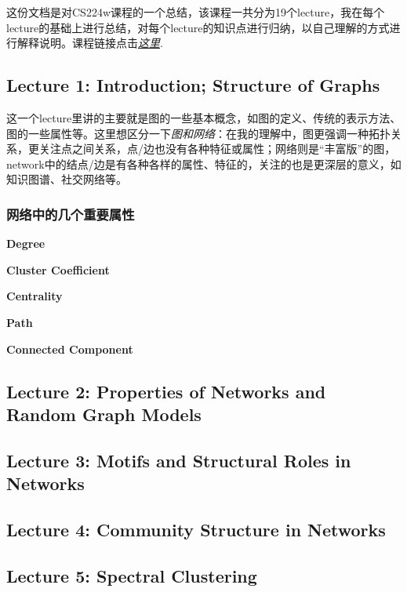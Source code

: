这份文档是对CS224w课程的一个总结，该课程一共分为19个lecture，我在每个lecture的基础上进行总结，对每个lecture的知识点进行归纳，以自己理解的方式进行解释说明。课程链接点击\href{http://web.stanford.edu/class/cs224w/}{\emph{这里}}. 

\subsection{Lecture 1: Introduction; Structure of Graphs }
这一个lecture里讲的主要就是图的一些基本概念，如图的定义、传统的表示方法、图的一些属性等。这里想区分一下\textit{图和网络}：在我的理解中，图更强调一种拓扑关系，更关注点之间关系，点/边也没有各种特征或属性；网络则是“丰富版”的图，network中的结点/边是有各种各样的属性、特征的，关注的也是更深层的意义，如知识图谱、社交网络等。
\subsubsection{网络中的几个重要属性}
\textbf{Degree} \par 
\textbf{Cluster Coefficient} \par 
\textbf{Centrality} \par 
\textbf{Path} \par 
\textbf{Connected Component} \par


\subsection{Lecture 2: Properties of Networks
and Random Graph Models}

\subsection{Lecture 3: Motifs and Structural Roles in Networks}

\subsection{Lecture 4: Community Structure in Networks}

\subsection{Lecture 5: Spectral Clustering}

